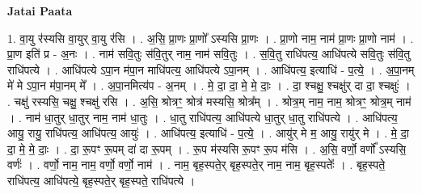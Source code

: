 \documentclass[17pt]{extarticle}
\begin{document}
\textbf{Jatai Paata} \newline

1. वा॒यु र॑स्यसि वा॒युर् वा॒यु र॑सि । . अ॒सि॒ प्रा॒णः प्रा॒णो᳚ ऽस्यसि प्रा॒णः । . प्रा॒णो नाम॒ नाम॑ प्रा॒णः प्रा॒णो नाम॑ । . प्रा॒ण इति॑ प्र - अ॒नः । . नाम॑ सवि॒तुः स॑वि॒तुर् नाम॒ नाम॑ सवि॒तुः । . स॒वि॒तु राधि॑पत्य॒ आधि॑पत्ये सवि॒तुः स॑वि॒तु राधि॑पत्ये । . आधि॑पत्ये ऽपा॒न म॑पा॒न माधि॑पत्य॒ आधि॑पत्ये ऽपा॒नम् । . आधि॑पत्य॒ इत्याधि॑ - प॒त्ये॒ । . अ॒पा॒नम् मे॑ मे ऽपा॒न म॑पा॒नम् मे᳚ । . अ॒पा॒नमित्य॑प - अ॒नम् । . मे॒ दा॒ दा॒ मे॒ मे॒ दाः॒ । . दा॒ श्चक्षु॒ श्चक्षु॑र् दा दा॒ श्चक्षुः॑ । . चक्षु॑ रस्यसि॒ चक्षु॒ श्चक्षु॑ रसि । . अ॒सि॒ श्रोत्रꣳ॒॒ श्रोत्र॑ मस्यसि॒ श्रोत्र᳚म् । . श्रोत्र॒म् नाम॒ नाम॒ श्रोत्रꣳ॒॒ श्रोत्र॒म् नाम॑ । . नाम॑ धा॒तुर् धा॒तुर् नाम॒ नाम॑ धा॒तुः । . धा॒तु राधि॑पत्य॒ आधि॑पत्ये धा॒तुर् धा॒तु राधि॑पत्ये । . आधि॑पत्य॒ आयु॒ रायु॒ राधि॑पत्य॒ आधि॑पत्य॒ आयुः॑ । . आधि॑पत्य॒ इत्याधि॑ - प॒त्ये॒ । . आयु॑र् मे म॒ आयु॒ रायु॑र् मे । . मे॒ दा॒ दा॒ मे॒ मे॒ दाः॒ । . दा॒ रू॒पꣳ रू॒पम् दा॑ दा रू॒पम् । . रू॒प म॑स्यसि रू॒पꣳ रू॒प म॑सि । . अ॒सि॒ वर्णो॒ वर्णो᳚ ऽस्यसि॒ वर्णः॑ । . वर्णो॒ नाम॒ नाम॒ वर्णो॒ वर्णो॒ नाम॑ । . नाम॒ बृह॒स्पते॒र् बृह॒स्पते॒र् नाम॒ नाम॒ बृह॒स्पतेः᳚ । . बृह॒स्पते॒ राधि॑पत्य॒ आधि॑पत्ये॒ बृह॒स्पते॒र् बृह॒स्पते॒ राधि॑पत्ये । \newline
\end{document}
